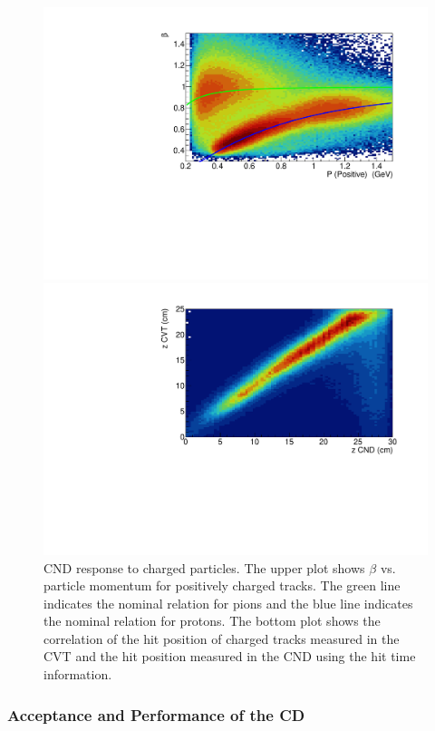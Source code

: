 \documentclass[final,3p]{elsarticle}
\begin{document}
\begin{twocolumn}
\begin{figure}[t!]
\centerline{\includegraphics[width=1.1\columnwidth]{CND-betaP.pdf}}
\centerline{\includegraphics[width=1.1\columnwidth]{CND-z.pdf}}
\caption{CND response to charged particles. The upper plot shows $\beta$ vs. particle momentum for positively
  charged tracks. The green line indicates the nominal relation for pions and the blue line indicates the nominal relation
  for protons. The bottom plot shows the correlation of the hit position of charged tracks measured in the CVT and the
  hit position measured in the CND using the hit time information.}
\label{cnd-performance}
\end{figure}

\subsubsection{Acceptance and Performance of the CD} 


\end{twocolumn}
\end{document}

